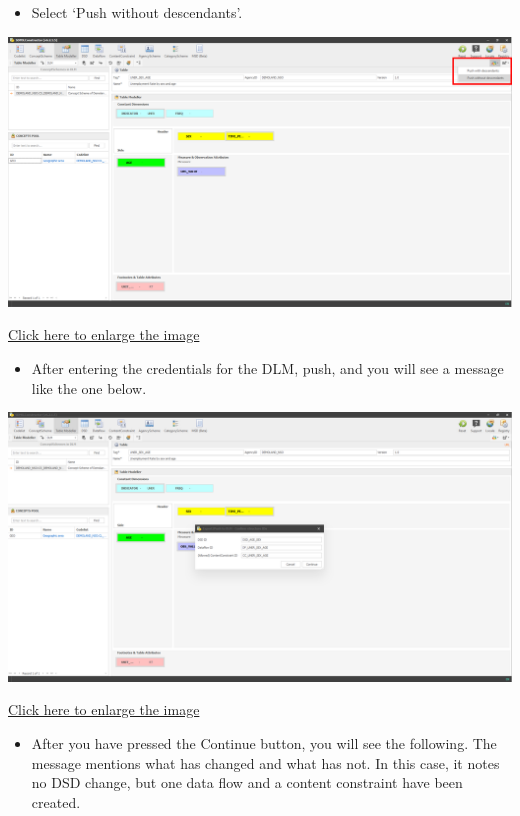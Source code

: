 \documentclass[
]{book}
\providecommand{\tightlist}{%
  \setlength{\itemsep}{0pt}\setlength{\parskip}{0pt}}
\begin{document}
\begin{itemize}
\tightlist
\item
  Select `Push without descendants'.
\end{itemize}

\begin{center}\includegraphics[width=1\linewidth]{./images/image226} \end{center}

\href{images/image226.png}{Click here to enlarge the image}

\begin{itemize}
\tightlist
\item
  After entering the credentials for the DLM, push, and you will see a message like the one below.
\end{itemize}

\begin{center}\includegraphics[width=1\linewidth]{./images/image228} \end{center}

\href{images/image228.png}{Click here to enlarge the image}

\begin{itemize}
\tightlist
\item
  After you have pressed the Continue button, you will see the following. The message mentions what has changed and what has not. In this case, it notes no DSD change, but one data flow and a content constraint have been created.
\end{itemize}
\end{document}
